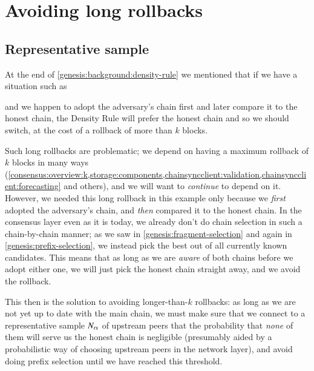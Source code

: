 \section{Avoiding long rollbacks}
\label{genesis:avoiding-long-rollbacks}

\subsection{Representative sample}

At the end of \cref{genesis:background:density-rule} we mentioned that if
we have a situation such as
%
\begin{center}
\end{center}
%
and we happen to adopt the adversary's chain first and later compare it to the
honest chain, the Density Rule will prefer the honest chain and so we should
switch, at the cost of a rollback of more than $k$ blocks.

Such long rollbacks are problematic; we depend on having a maximum rollback of
$k$ blocks in many ways
(\cref{consensus:overview:k,storage:components,chainsyncclient:validation,chainsyncclient:forecasting}
and others), and we will want to \emph{continue} to depend on it. However, we
needed this long rollback in this example only because we \emph{first} adopted
the adversary's chain, and \emph{then} compared it to the honest chain. In the
consensus layer even as it is today, we already don't do chain selection in such
a chain-by-chain manner; as we saw in \cref{genesis:fragment-selection} and
again in \cref{genesis:prefix-selection}, we instead pick the best out of all
currently known candidates. This means that as long as we are \emph{aware} of
both chains before we adopt either one, we will just pick the honest chain
straight away, and we avoid the rollback.

This then is the solution to avoiding longer-than-$k$ rollbacks: as long as we
are not yet up to date with the main chain, we must make sure that we connect to
a representative sample $N_\mathit{rs}$ of upstream peers that the probability
that \emph{none} of them will serve us the honest chain is negligible
(presumably aided by a probabilistic way of choosing upstream peers in the
network layer), and avoid doing prefix selection until we have reached
this threshold.

